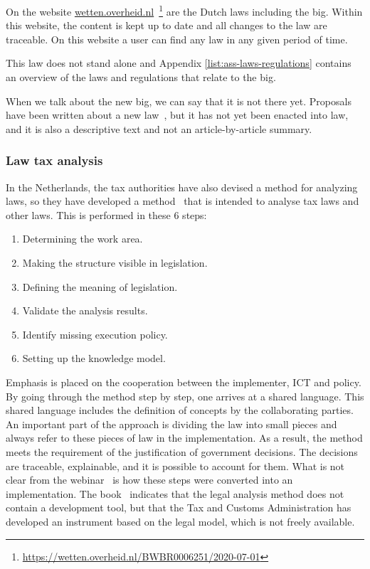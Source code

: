 On the  website  {\url{wetten.overheid.nl}}~\footnote{\url{https://wetten.overheid.nl/BWBR0006251/2020-07-01}} are the Dutch laws including the \acrshort{big}.
Within this website, the content is kept up to date and all changes to the law are traceable.
On this website a user can find any law in any given period of time.


This law does not stand alone and Appendix \ref{list:ass-laws-regulations} contains an overview of the laws and regulations that relate to the \acrshort{big}.

When we talk about the new \acrshort{big}, we can say that it is not there yet.
Proposals have been written about a new law~, but it has not yet been enacted into law, and it is also a descriptive text and not an article-by-article summary.


\subsubsection{Law tax analysis} \label{law_analysis}
In the Netherlands, the tax authorities have also devised a method for analyzing laws, so they have developed a method~ that is intended to analyse tax laws and other laws.
This is performed in these 6 steps:
\begin{enumerate}
    \item Determining the work area.
    \item Making the structure visible in legislation.
    \item Defining the meaning of legislation.
    \item Validate the analysis results.
    \item Identify missing execution policy.
    \item Setting up the knowledge model.
\end{enumerate}
Emphasis is placed on the cooperation between the implementer, ICT and policy.
By going through the method step by step, one arrives at a shared language.
This shared language includes the definition of concepts by the collaborating parties.
An important part of the approach is dividing the law into small pieces and always refer to these pieces of law in the implementation.
As a result, the method meets the requirement of the justification of government decisions.
The decisions are traceable, explainable, and it is possible to account for them.
What is not clear from the webinar~ is how these steps were converted into an implementation.
The book~ indicates that the legal analysis method does not contain a development tool, but that the Tax and Customs Administration has developed an instrument based on the legal model, which is not freely available.